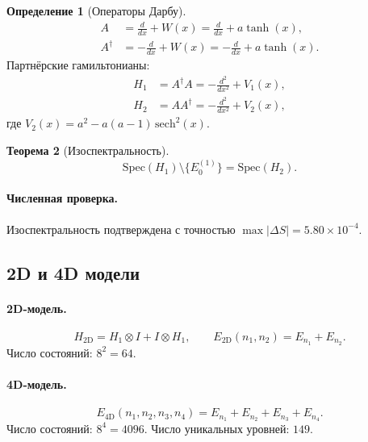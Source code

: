 \documentclass[11pt,a4paper]{article}
\newtheorem{theorem}{Теорема}[section]
\theoremstyle{definition}
\newtheorem{definition}[theorem]{Определение}
\begin{document}
\begin{definition}[Операторы Дарбу]
\label{def:membrane-darboux-review}
\begin{align}
    A &= \frac{d}{dx} + W(x) = \frac{d}{dx} + a \tanh(x), \\
    A^\dagger &= -\frac{d}{dx} + W(x) = -\frac{d}{dx} + a \tanh(x).
\end{align}
Партнёрские гамильтонианы:
\begin{align}
    H_1 &= A^\dagger A = -\frac{d^2}{dx^2} + V_1(x), \\
    H_2 &= A A^\dagger = -\frac{d^2}{dx^2} + V_2(x),
\end{align}
где $V_2(x) = a^2 - a(a-1) \, \mathrm{sech}^2(x)$.
\end{definition}

\begin{theorem}[Изоспектральность]
\label{thm:membrane-isospectrality-review}
\begin{equation}
    \boxed{
    \mathrm{Spec}(H_1) \setminus \{E_0^{(1)}\} = \mathrm{Spec}(H_2).
    }
    \label{eq:membrane-isospectrality-review}
\end{equation}
\end{theorem}

\paragraph{Численная проверка.}
Изоспектральность подтверждена с точностью 
$\max|\Delta S| = 5.80 \times 10^{-4}$.

\subsection{2D и 4D модели}

\paragraph{2D-модель.}
\begin{equation}
    H_{\text{2D}} = H_1 \otimes I + I \otimes H_1, \qquad
    E_{\text{2D}}(n_1, n_2) = E_{n_1} + E_{n_2}.
\end{equation}
Число состояний: $8^2 = 64$.

\paragraph{4D-модель.}
\begin{equation}
    E_{\text{4D}}(n_1, n_2, n_3, n_4) = E_{n_1} + E_{n_2} + E_{n_3} + E_{n_4}.
\end{equation}
Число состояний: $8^4 = 4096$.
Число уникальных уровней: $149$.
\end{document}
